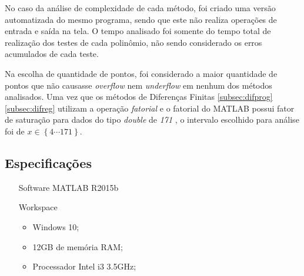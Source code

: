 \documentclass[conference]{IEEEtran}
\begin{document}
No caso da análise de complexidade de cada método, foi criado uma versão automatizada do mesmo programa, sendo que este não realiza operações de entrada e saída na tela. O tempo analisado foi somente do tempo total de realização dos testes de cada polinômio, não sendo considerado os erros acumulados de cada teste. 

Na escolha de quantidade de pontos, foi considerado a maior quantidade de pontos que não causasse \emph{overflow} nem \emph{underflow} em nenhum dos métodos analisados. Uma vez que os métodos de Diferenças Finitas \ref{subsec:difprog} \ref{subsec:difreg} utilizam a operação \emph{fatorial} e o fatorial do MATLAB possui fator de saturação para dados do tipo \emph{double} de \emph{171} \cite{fac}, o intervalo escolhido para análise foi de $x \in \left \{ 4 \cdots 171  \right \}$.
\subsection{Especificações} \label{subsec:espec}
\begin{itemize}[leftmargin=23.5mm]
  \item [Software] MATLAB R2015b
  \item [Workspace]
    \begin{itemize}
      \item Windows 10;
      \item 12GB de memória RAM;
      \item Processador Intel i3 3.5GHz;
    \end{itemize}
  
\end{itemize}
\end{document}
